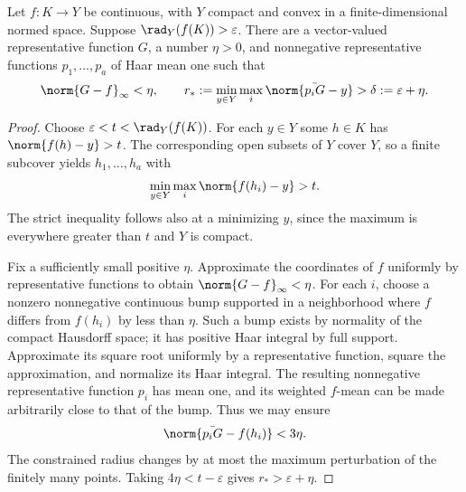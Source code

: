 \begin{lemma}\label{lem:radiuslocal54}
Let $f:K\to Y$ be continuous, with $Y$ compact and convex in a finite-dimensional normed space. Suppose $\rad_Y(f(K))>\varepsilon$. There are a vector-valued representative function $G$, a number $\eta>0$, and nonnegative representative functions $p_1,\ldots,p_a$ of Haar mean one such that
\[
 \norm{G-f}_\infty<\eta,\qquad
 r_*:=\min_{y\in Y}\max_i\norm{\bar{p_iG}-y}>\delta:=\varepsilon+\eta.
\]
\end{lemma}
\begin{proof}
Choose $\varepsilon<t<\rad_Y(f(K))$. For each $y\in Y$ some $h\in K$ has $\norm{f(h)-y}>t$. The corresponding open subsets of $Y$ cover $Y$, so a finite subcover yields $h_1,\ldots,h_a$ with
\[
 \min_{y\in Y}\max_i\norm{f(h_i)-y}>t.
\]
The strict inequality follows also at a minimizing $y$, since the maximum is everywhere greater than $t$ and $Y$ is compact.

Fix a sufficiently small positive $\eta$. Approximate the coordinates of $f$ uniformly by representative functions to obtain $\norm{G-f}_\infty<\eta$. For each $i$, choose a nonzero nonnegative continuous bump supported in a neighborhood where $f$ differs from $f(h_i)$ by less than $\eta$. Such a bump exists by normality of the compact Hausdorff space; it has positive Haar integral by full support. Approximate its square root uniformly by a representative function, square the approximation, and normalize its Haar integral. The resulting nonnegative representative function $p_i$ has mean one, and its weighted $f$-mean can be made arbitrarily close to that of the bump. Thus we may ensure
\[
 \norm{\bar{p_iG}-f(h_i)}<3\eta.
\]
The constrained radius changes by at most the maximum perturbation of the finitely many points. Taking $4\eta<t-\varepsilon$ gives $r_*>\varepsilon+\eta$.
\end{proof}


